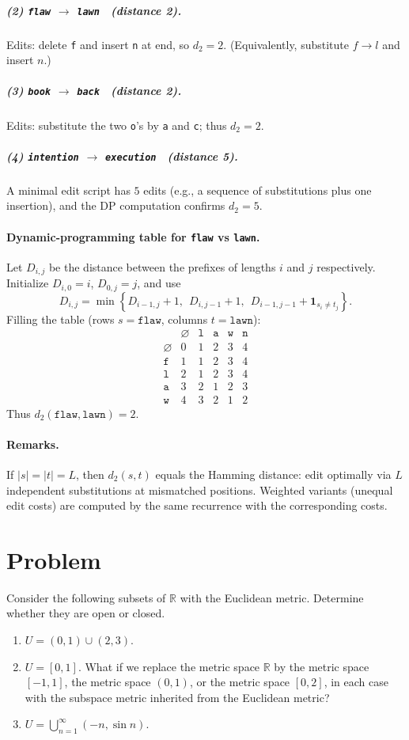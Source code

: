 \documentclass[12pt,a4paper]{article}
\begin{document}
\subparagraph{(2) \texttt{flaw} $\to$ \texttt{lawn} \ (distance 2).}
Edits: delete \texttt{f} and insert \texttt{n} at end, so $d_2=2$.
(Equivalently, substitute $f\to l$ and insert $n$.)

\subparagraph{(3) \texttt{book} $\to$ \texttt{back} \ (distance 2).}
Edits: substitute the two \texttt{o}'s by \texttt{a} and \texttt{c}; thus $d_2=2$.

\subparagraph{(4) \texttt{intention} $\to$ \texttt{execution} \ (distance 5).}
A minimal edit script has $5$ edits (e.g., a sequence of substitutions plus one insertion), and the DP computation confirms $d_2=5$.

\paragraph{Dynamic-programming table for \texttt{flaw} vs \texttt{lawn}.}
Let $D_{i,j}$ be the distance between the prefixes of lengths $i$ and $j$ respectively. Initialize $D_{i,0}=i$, $D_{0,j}=j$, and use
\[
D_{i,j}=\min\left\{D_{i-1,j}+1,\ \ D_{i,j-1}+1,\ \ D_{i-1,j-1}+\mathbf 1_{s_i\ne t_j}\right\}.
\]
Filling the table (rows $s=\texttt{flaw}$, columns $t=\texttt{lawn}$):
\[
\begin{array}{c|ccccc}
	& \varnothing & \texttt{l} & \texttt{a} & \texttt{w} & \texttt{n}\\\hline
	\varnothing & 0 & 1 & 2 & 3 & 4\\
	\texttt{f}  & 1 & 1 & 2 & 3 & 4\\
	\texttt{l}  & 2 & 1 & 2 & 3 & 4\\
	\texttt{a}  & 3 & 2 & 1 & 2 & 3\\
	\texttt{w}  & 4 & 3 & 2 & 1 & 2
\end{array}
\]
Thus $d_2(\texttt{flaw},\texttt{lawn})=2$.

\paragraph{Remarks.}
If $|s|=|t|=L$, then $d_2(s,t)$ equals the Hamming distance: edit optimally via $L$ independent substitutions at mismatched positions.
Weighted variants (unequal edit costs) are computed by the same recurrence with the corresponding costs.

\section*{Problem}
Consider the following subsets of $\mathbb{R}$ with the Euclidean metric. Determine whether they are open or closed.
\begin{enumerate}[label=(\alph*)]
	\item $U=(0,1)\cup(2,3)$.
	\item $U=[0,1]$. What if we replace the metric space $\mathbb{R}$ by the metric space $[-1,1]$, the metric space $(0,1)$, or the metric space $[0,2]$, in each case with the subspace metric inherited from the Euclidean metric?
	\item $U=\displaystyle\bigcup_{n=1}^{\infty}(-n,\sin n)$.
\end{enumerate}
\end{document}
